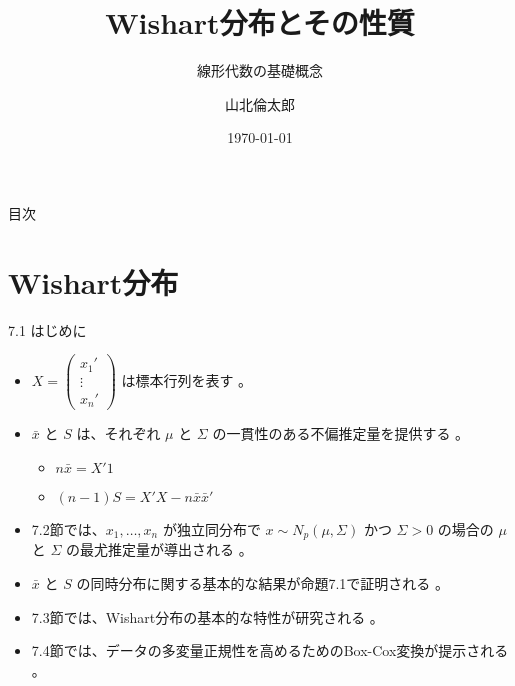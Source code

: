 \documentclass[aspectratio=169]{beamer}
\begin{document}
\begin{CJK}{UTF8}{min}

\title{Wishart分布とその性質}
\subtitle{線形代数の基礎概念}
\author{山北倫太郎}
\date{\today}

\begin{frame}
\titlepage
\end{frame}

\begin{frame}{目次}
\tableofcontents
\end{frame}

\section{Wishart分布}

\begin{frame}{7.1 はじめに}
\begin{itemize}
    \item $X=\begin{pmatrix}x_1' \\ \vdots \\ x_n'\end{pmatrix}$ は標本行列を表す 。
    \item $\bar{x}$ と $S$ は、それぞれ $\mu$ と $\Sigma$ の一貫性のある不偏推定量を提供する 。
    \begin{itemize}
        \item $n\bar{x}=X'1$ 
        \item $(n-1)S=X'X-n\bar{x}\bar{x}'$ 
    \end{itemize}
    \item 7.2節では、$x_1, \dots, x_n$ が独立同分布で $x \sim N_p(\mu, \Sigma)$ かつ $\Sigma>0$ の場合の $\mu$ と $\Sigma$ の最尤推定量が導出される 。
    \item $\bar{x}$ と $S$ の同時分布に関する基本的な結果が命題7.1で証明される 。
    \item 7.3節では、Wishart分布の基本的な特性が研究される 。
    \item 7.4節では、データの多変量正規性を高めるためのBox-Cox変換が提示される 。
\end{itemize}
\end{frame}


\end{CJK}
\end{document}
